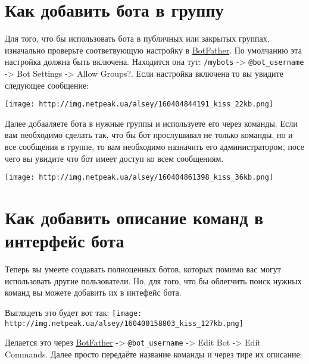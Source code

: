 \documentclass[
]{book}
\begin{document}
\hypertarget{ux43aux430ux43a-ux434ux43eux431ux430ux432ux438ux442ux44c-ux431ux43eux442ux430-ux432-ux433ux440ux443ux43fux43fux443}{%
\section{Как добавить бота в группу}\label{ux43aux430ux43a-ux434ux43eux431ux430ux432ux438ux442ux44c-ux431ux43eux442ux430-ux432-ux433ux440ux443ux43fux43fux443}}

Для того, что бы использовать бота в публичных или закрытых группах, изначально проверьте соответвующую настройку в \href{http://t.me/BotFather}{BotFather}. По умолчанию эта настройка должна быть включена. Находится она тут: \texttt{/mybots} -\textgreater{} \texttt{@bot\_username} -\textgreater{} Bot Settings -\textgreater{} Allow Groups?. Если настройка включена то вы увидите следующее сообщение:

\texttt{[image: http://img.netpeak.ua/alsey/160404844191\_kiss\_22kb.png]}

Далее добааляете бота в нужные группы и используете его через команды. Если вам необходимо сделать так, что бы бот прослушивал не только команды, но и все сообщения в группе, то вам необходимо назначить его администратором, посе чего вы увидите что бот имеет доступ ко всем сообщениям.

\texttt{[image: http://img.netpeak.ua/alsey/160404861398\_kiss\_36kb.png]}

\hypertarget{ux43aux430ux43a-ux434ux43eux431ux430ux432ux438ux442ux44c-ux43eux43fux438ux441ux430ux43dux438ux435-ux43aux43eux43cux430ux43dux434-ux432-ux438ux43dux442ux435ux440ux444ux435ux439ux441-ux431ux43eux442ux430}{%
\section{Как добавить описание команд в интерфейс бота}\label{ux43aux430ux43a-ux434ux43eux431ux430ux432ux438ux442ux44c-ux43eux43fux438ux441ux430ux43dux438ux435-ux43aux43eux43cux430ux43dux434-ux432-ux438ux43dux442ux435ux440ux444ux435ux439ux441-ux431ux43eux442ux430}}

Теперь вы умеете создавать полноценных ботов, которых помимо вас могут использовать другие пользователи. Но, для того, что бы облегчить поиск нужных команд вы можете добавить их в интефейс бота.

Выглядеть это будет вот так:
\texttt{[image: http://img.netpeak.ua/alsey/160400158803\_kiss\_127kb.png]}

Делается это через \href{@@BotFather}{BotFather} -\textgreater{} \texttt{@bot\_username} -\textgreater{} Edit Bot -\textgreater{} Edit Commands. Далее просто передаёте название команды и через тире их описание:
\end{document}

